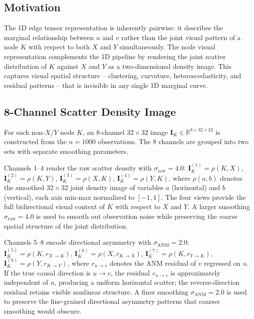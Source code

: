 \subsection{Motivation}

The 1D edge tensor representation is inherently pairwise: it describes the marginal relationship between $u$ and $v$ rather than the joint visual pattern of a node $K$ with respect to both $X$ and $Y$ simultaneously. The node visual representation complements the 1D pipeline by rendering the joint scatter distribution of $K$ against $X$ and $Y$ as a two-dimensional density image. This captures visual spatial structure -- clustering, curvature, heteroscedasticity, and residual patterns -- that is invisible in any single 1D marginal curve.

\subsection{8-Channel Scatter Density Image}

For each non-$X$/$Y$ node $K$, an 8-channel $32 \times 32$ image $\mathbf{I}_K \in \mathbb{R}^{8 \times 32 \times 32}$ is constructed from the $n = 1000$ observations. The 8 channels are grouped into two sets with separate smoothing parameters.

Channels 1--4 render the raw scatter density with $\sigma_{\mathrm{raw}} = 4.0$: $\mathbf{I}_K^{(1)} = \rho(K, X)$, $\mathbf{I}_K^{(2)} = \rho(K, Y)$, $\mathbf{I}_K^{(3)} = \rho(X, K)$, $\mathbf{I}_K^{(4)} = \rho(Y, K)$, where $\rho(a, b)$ denotes the smoothed $32 \times 32$ joint density image of variables $a$ (horizontal) and $b$ (vertical), each axis min-max normalized to $[-1, 1]$. The four views provide the full bidirectional visual context of $K$ with respect to $X$ and $Y$. A larger smoothing $\sigma_{\mathrm{raw}} = 4.0$ is used to smooth out observation noise while preserving the coarse spatial structure of the joint distribution.

Channels 5--8 encode directional asymmetry with $\sigma_{\mathrm{ANM}} = 2.0$: $\mathbf{I}_K^{(5)} = \rho(K, r_{X \to K})$, $\mathbf{I}_K^{(6)} = \rho(X, r_{K \to X})$, $\mathbf{I}_K^{(7)} = \rho(K, r_{Y \to K})$, $\mathbf{I}_K^{(8)} = \rho(Y, r_{K \to Y})$, where $r_{u \to v}$ denotes the ANM residual of $v$ regressed on $u$. If the true causal direction is $u \to v$, the residual $r_{u \to v}$ is approximately independent of $u$, producing a uniform horizontal scatter; the reverse-direction residual retains visible nonlinear structure. A finer smoothing $\sigma_{\mathrm{ANM}} = 2.0$ is used to preserve the fine-grained directional asymmetry patterns that coarser smoothing would obscure.

